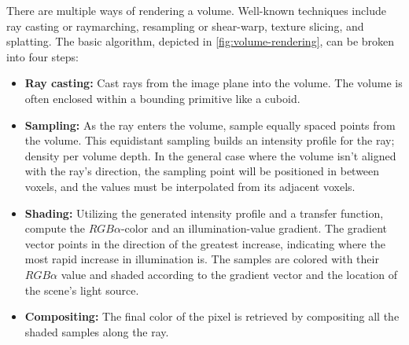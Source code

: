 
There are multiple ways of rendering a volume. Well-known techniques include ray casting or raymarching, resampling or shear-warp, texture slicing, and splatting. The basic algorithm, depicted in \autoref{fig:volume-rendering}, can be broken into four steps:

\begin{itemize}
    \item \textbf{Ray casting:} Cast rays from the image plane into the volume. The volume is often enclosed within a bounding primitive like a cuboid.
    \item \textbf{Sampling:} As the ray enters the volume, sample equally spaced points from the volume. This equidistant sampling builds an intensity profile for the ray; density per volume depth. In the general case where the volume isn't aligned with the ray's direction, the sampling point will be positioned in between voxels, and the values must be interpolated from its adjacent voxels.
    \item \textbf{Shading:} Utilizing the generated intensity profile and a transfer function, compute the $RGB\alpha$-color and an illumination-value gradient. The gradient vector points in the direction of the greatest increase, indicating where the most rapid increase in illumination is. The samples are colored with their $RGB\alpha$ value and shaded according to the gradient vector and the location of the scene's light source.
    \item \textbf{Compositing:} The final color of the pixel is retrieved by compositing all the shaded samples along the ray. 
\end{itemize}




\begin{comment}
\subsection{Alpha compositing}
Alpha compositing is the process of combining one image with a background to create the appearance of partial or full transparency \cite{wiki:Alpha_compositing}.

\subsection{Ray marching}
\end{comment}



